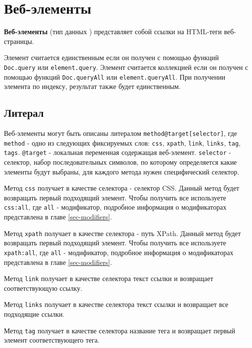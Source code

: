 \section{Веб-элементы}
\label{webelments}

{\bf Веб-элементы} (тип данных \element) представляет собой ссылки на HTML-теги веб-страницы.

Элемент считается единственным если он получен с помощью функций \lstinline|Doc.query| или \lstinline|element.query|. Элемент считается коллекцией если он получен с помощью функций \lstinline|Doc.queryAll| или \lstinline|element.queryAll|. При получении элемента по индексу, результат также будет единственным.

\subsection{Литерал}

Веб-элементы могут быть описаны литералом \lstinline|method@target[selector]|, где \lstinline|method| - одно из следующих фиксируемых слов: \lstinline|css|, \lstinline|xpath|, \lstinline|link|, \lstinline|links|, \lstinline|tag|, \lstinline|tags|. \lstinline|@target| - локальная переменная содержащая веб-элемент. \lstinline|selector| - селектор, набор последовательных символов, по которому определяется какие элементы будут выбраны, для каждого метода нужен специфический селектор.

Метод \lstinline|css| получает в качестве селектора - селектор CSS. Данный метод будет возвращать первый подходящий элемент. Чтобы получить все используете \lstinline|css:all|, где \lstinline|all| - модификатор, подробное информация о модификаторах представлена в главе \ref{sec-modifiers}.

Метод \lstinline|xpath| получает в качестве селектора - путь XPath. Данный метод будет возвращать первый подходящий элемент. Чтобы получить все используете \lstinline|xpath:all|, где \lstinline|all| - модификатор, подробное информация о модификаторах представлена в главе \ref{sec-modifiers}.

Метод \lstinline|link| получает в качестве селектора текст ссылки и возвращает соответствующую ссылку.

Метод \lstinline|links| получает в качестве селектора текст ссылки и возвращает все подходящие ссылки.

Метод \lstinline|tag| получает в качестве селектора название тега и возвращает первый элемент соответствующего тега.

